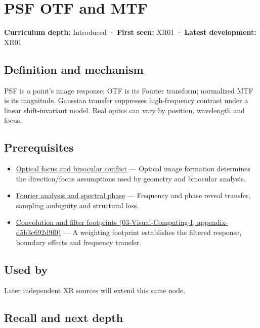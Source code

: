\hypertarget{appendix-8b76b0efd27f}{}
\section{PSF OTF and MTF}\label{appendix-8b76b0efd27f-psf-otf-and-mtf}

\textbf{Curriculum depth:} Introduced · \textbf{First seen:} XR01 · \textbf{Latest development:} XR01

\subsection{Definition and mechanism}\label{appendix-8b76b0efd27f-definition-and-mechanism}

PSF is a point's image response; OTF is its Fourier transform; normalized MTF is its magnitude. Gaussian transfer suppresses high-frequency contrast under a linear shift-invariant model. Real optics can vary by position, wavelength and focus.

\subsection{Prerequisites}\label{appendix-8b76b0efd27f-prerequisites}

\begin{itemize}
\tightlist
\item
  \hyperref[appendix-f90cee1be7a4]{Optical focus and binocular conflict} --- Optical image formation determines the direction/focus assumptions used by geometry and binocular analysis.
\item
  \hyperref[appendix-b60686ba06a1]{Fourier analysis and spectral phase} --- Frequency and phase reveal transfer, sampling ambiguity and structural loss.
\item
  \href{../03-Visual-Computing-I/main.pdf\#nameddest=appendix-d5b3c692d9f0}{Convolution and filter footprints (03-Visual-Computing-I, appendix-d5b3c692d9f0)} --- A weighting footprint establishes the filtered response, boundary effects and frequency transfer.
\end{itemize}

\subsection{Used by}\label{appendix-8b76b0efd27f-used-by}

Later independent XR sources will extend this same node.

\subsection{Recall and next depth}\label{appendix-8b76b0efd27f-recall-and-next-depth}

